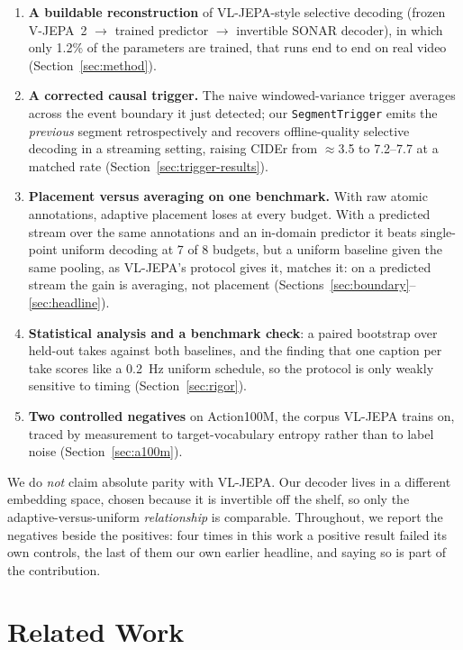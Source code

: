 \documentclass[journal]{IEEEtran}
\begin{document}
\begin{enumerate}
\item \textbf{A buildable reconstruction} of VL-JEPA-style selective decoding
(frozen V-JEPA~2 $\rightarrow$ trained predictor $\rightarrow$ invertible SONAR
decoder), in which only 1.2\% of the parameters are trained, that runs end to end
on real video (Section~\ref{sec:method}).
\item \textbf{A corrected causal trigger.} The naive windowed-variance trigger
averages across the event boundary it just detected; our \texttt{SegmentTrigger}
emits the \emph{previous} segment retrospectively and recovers offline-quality
selective decoding in a streaming setting, raising CIDEr from $\approx$3.5 to
7.2--7.7 at a matched rate (Section~\ref{sec:trigger-results}).
\item \textbf{Placement versus averaging on one benchmark.} With raw atomic
annotations, adaptive placement loses at every budget. With a predicted stream
over the same annotations and an in-domain predictor it beats single-point uniform
decoding at 7 of 8 budgets, but a uniform baseline given the same pooling, as
VL-JEPA's protocol gives it, matches it: on a predicted stream the gain is
averaging, not placement (Sections~\ref{sec:boundary}--\ref{sec:headline}).
\item \textbf{Statistical analysis and a benchmark check}: a paired bootstrap over
held-out takes against both baselines, and the finding that one caption per take
scores like a 0.2~Hz uniform schedule, so the protocol is only weakly sensitive to
timing (Section~\ref{sec:rigor}).
\item \textbf{Two controlled negatives} on Action100M, the corpus VL-JEPA trains
on, traced by measurement to target-vocabulary entropy rather than to label noise
(Section~\ref{sec:a100m}).
\end{enumerate}

We do \emph{not} claim absolute parity with VL-JEPA. Our decoder lives in a
different embedding space, chosen because it is invertible off the shelf, so only
the adaptive-versus-uniform \emph{relationship} is comparable. Throughout, we
report the negatives beside the positives: four times in this work a positive
result failed its own controls, the last of them our own earlier headline, and
saying so is part of the contribution.

\section{Related Work}
\end{document}
